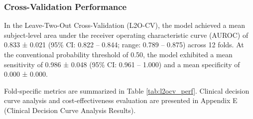 \documentclass[12pt, a4paper]{article}
\begin{document}
\subsubsection{Cross-Validation Performance}
In the Leave-Two-Out Cross-Validation (L2O-CV), the model achieved a mean subject-level area under the receiver operating characteristic curve (AUROC) of 0.833 ± 0.021 (95\% CI: 0.822 -- 0.844; range: 0.789 -- 0.875) across 12 folds. At the conventional probability threshold of 0.50, the model exhibited a mean sensitivity of 0.986 ± 0.048 (95\% CI: 0.961 -- 1.000) and a mean specificity of 0.000 ± 0.000.

Fold-specific metrics are summarized in Table \ref{tab:l2ocv_perf}. Clinical decision curve analysis and cost-effectiveness evaluation are presented in Appendix E (Clinical Decision Curve Analysis Results).

\begin{table}[H]
\centering
\normalsize
\caption{Fold-Level Performance Metrics in L2O-CV Validation}
\label{tab:l2ocv_perf}
\end{table}
\end{document}
